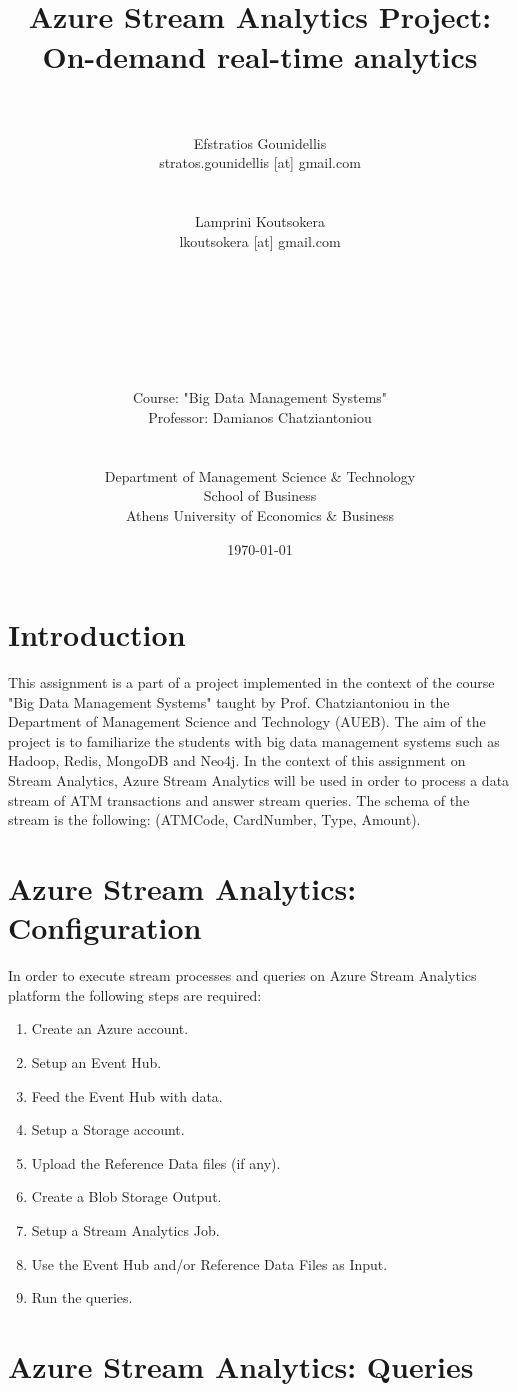 \documentclass[11pt]{article}
\title{
    \horrule{0.5pt} \\ [0.4cm]
    \huge  {Azure Stream Analytics Project: On-demand real-time analytics}\\
    \horrule{2pt} \\[0.5cm]	
\vspace{10px}
}
\author{\large Efstratios Gounidellis\\stratos.gounidellis [at] gmail.com \\ \\ \\ 
		Lamprini Koutsokera\\lkoutsokera [at] gmail.com \\ \\ \\ \\ \\ \\ \\ \\
Course: "Big Data Management Systems"
\\
Professor: Damianos Chatziantoniou
\\ \\ \\
\vspace{40px}
Department of Management Science \& Technology
\\ School of Business
\\
Athens University of Economics \& Business} %
\date{
\vfill \large\today} %
\begin{document}
    
\maketitle

\pagebreak 

\tableofcontents

\pagebreak 
 
\section{Introduction}\label{introduction}
This assignment is a part of a project implemented in the context of the course "Big Data Management Systems" taught by Prof. Chatziantoniou in the Department of Management Science and Technology (AUEB). The aim of the project is to familiarize the students with big data management systems such as Hadoop, Redis, MongoDB and Neo4j.
\newline\newline\noindent
In the context of this assignment on Stream Analytics, Azure Stream Analytics will be used in order to process a data stream of ATM transactions and answer stream queries. The schema of the stream is the following: (ATMCode, CardNumber, Type, Amount).

\section{Azure Stream Analytics: Configuration}\label{azure-stream-analytics-configuration}

In order to execute stream processes and queries on Azure Stream Analytics platform the following steps are required:
\begin{enumerate}
	\item Create an Azure account.
	\item Setup an Event Hub.
	\item Feed the Event Hub with data.
	\item Setup a Storage account.
	\item Upload the Reference Data files (if any).
	\item Create a Blob Storage Output.
	\item Setup a Stream Analytics Job.
	\item Use the Event Hub and/or Reference Data Files as Input.
	\item Run the queries.
\end{enumerate}
    

\section{Azure Stream Analytics: Queries}\label{queries-execution}
\end{document}
